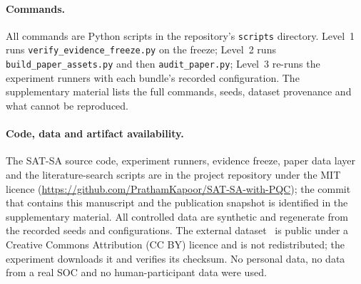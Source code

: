 \paragraph{Commands.}
All commands are Python scripts in the repository's \texttt{scripts} directory.
Level~1 runs \texttt{verify\_\allowbreak evidence\_\allowbreak freeze.py} on the
freeze; Level~2 runs \texttt{build\_\allowbreak paper\_\allowbreak assets.py} and then
\texttt{audit\_\allowbreak paper.py}; Level~3 re-runs
the experiment runners with each bundle's recorded configuration. The supplementary
material lists the full commands, seeds, dataset provenance and what cannot be
reproduced.

\paragraph{Code, data and artifact availability.}
The SAT-SA source code, experiment runners, evidence freeze, paper data layer and
the literature-search scripts are in the project repository under the MIT licence
(\url{https://github.com/PrathamKapoor/SAT-SA-with-PQC}); the commit that
contains this manuscript and the publication snapshot is identified in the
supplementary material. All controlled data are synthetic and regenerate from the
recorded seeds and configurations. The external dataset~\cite{amaral2018uci498}
is public under a Creative Commons Attribution (CC BY) licence and is not
redistributed; the experiment downloads it
and verifies its checksum. No personal data, no data from a real SOC and no
human-participant data were used.
